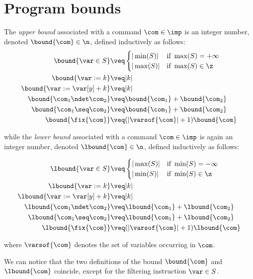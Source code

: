 \section{Program bounds}
\label{sec:bounds}

\begin{definition}
  \label{de:bound}
  The \emph{upper bound} associated with a command \(\com\in \imp\) is
  an integer number, denoted \(\bound{\com}\in \n\), defined
  inductively as follows:
  \begin{align*}
    \bound{\var \in S}  
    & \veq \begin{cases}
      |\min(S)| & \text{if } \max(S)=+\infty\\
      |\max(S)| & \text{if } \max(S)\in\z
    \end{cases}
    \\
    \bound{\var := k} 
    & \veq | k |\\
    \bound{\var := \var[y] + k}
    & \veq | k |\\
    \bound{\com_1 \ndet \com_2}
    & \veq \bound{\com_1} + \bound{\com_2}\\
    \bound{\com_1 \seq \com_2}
    & \veq \bound{\com_1} + \bound{\com_2}\\
    \bound{\fix{\com}}
    & \veq (|\varsof{\com}|+1) \bound{\com} \\ 
  \end{align*}

  while the \emph{lower bound} associated with a command
  \(\com\in \imp\) is again an integer number, denoted
  \(\lbound{\com}\in \n\), defined inductively as follows:

  \begin{align*}
    \lbound{\var \in S}  
    & \veq \begin{cases}
      |\max(S)| & \text{if } \min(S)=-\infty\\
      |\min(S)| & \text{if } \min(S)\in \z
    \end{cases}
    \\
    \lbound{\var := k} 
    & \veq | k |\\
    \lbound{\var := \var[y] + k}
    & \veq | k |\\
    \lbound{\com_1 \ndet \com_2}
    & \veq \lbound{\com_1} + \lbound{\com_2}\\
    \lbound{\com_1 \seq \com_2}
    & \veq \lbound{\com_1} + \lbound{\com_2}\\
    \lbound{\fix{\com}}
    & \veq (|\varsof{\com}|+1) \lbound{\com} \\ 
  \end{align*}

  where \(\varsof{\com}\) denotes the set of variables occurring in 
  \(\com\).
\end{definition}

We can notice that the two definitions of the bound \(\bound{\com}\)
and \(\lbound{\com}\) coincide, except for the filtering instruction
\(\var\in S\).
